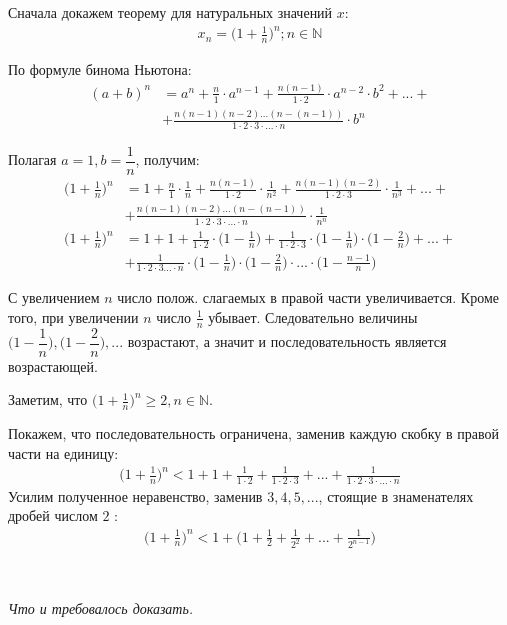 \documentclass[a4paper,12pt,oneside]{extbook}
\newcommand{\newpar}{$ $\par\nobreak\ignorespaces}
\theoremstyle{numbered}
\theoremstyle{unnumbered}
\theoremstyle{named}
\theoremstyle{unnumbered}
\theoremstyle{named}
\theoremstyle{named}
\theoremstyle{named}
\renewenvironment{proof}[1][]{\breakenv[Доказательство]{\if\relax\detokenize{#1}\relax\else\;\fi}{\textbf{#1}}}{\smallskip\newpar \hfill\textit{Что и требовалось доказать.}}
\begin{document}
\begin{proof}
    Сначала докажем теорему для натуральных значений \(x\):
    \begin{gather*}
        x_n = \Big(1 + \frac{1}{n}\Big)^n; n \in \mathbb{N}
    \end{gather*}

    По формуле бинома Ньютона:
    \begin{align*}
        (a + b)^n & = a^n + \frac{n}{1} \cdot a^{n - 1} + \frac{n(n - 1)}{1 \cdot 2} \cdot a^{n - 2} \cdot b^2 + ... + \\
                  & + \frac{n(n - 1)(n - 2)...(n - (n - 1))}{1 \cdot 2 \cdot 3 \cdot ... \cdot n} \cdot b^n
    \end{align*}

    Полагая \(a = 1, b = \dfrac{1}{n}\), получим:
    \begin{align*}
        \Big(1 + \frac{1}{n}\Big)^n & = 1 + \frac{n}{1} \cdot \frac{1}{n} + \frac{n(n - 1)}{1 \cdot 2} \cdot \frac{1}{n^2} +
        \frac{n(n - 1)(n - 2)}{1 \cdot 2 \cdot 3} \cdot \frac{1}{n^3} + ... +                                                                                                                             \\
                                    & +                            \frac{n(n - 1)(n - 2)...(n - (n - 1))}{1 \cdot 2 \cdot 3 \cdot ... \cdot n} \cdot \frac{1}{n^n}                                        \\
        \Big(1 + \frac{1}{n}\Big)^n & = 1 + 1 + \frac{1}{1 \cdot 2} \cdot \Big(1 - \frac{1}{n}\Big) + \frac{1}{1 \cdot 2 \cdot 3} \cdot \Big(1 - \frac{1}{n}\Big) \cdot \Big(1 - \frac{2}{n}\Big) + ... + \\
                                    & + \frac{1}{1 \cdot 2 \cdot 3 ... \cdot n} \cdot \Big(1 - \frac{1}{n}\Big) \cdot \Big(1 - \frac{2}{n}\Big) \cdot ... \cdot \Big(1 - \frac{n - 1}{n}\Big)
    \end{align*}

    С увеличением \(n\) число полож. слагаемых в правой части увеличивается. Кроме того, при увеличении \(n\) число  \(\frac{1}{n}\) убывает. Следовательно величины \(\Big(1 - \dfrac{1}{n}\Big), \Big(1 - \dfrac{2}{n}\Big), ...\) возрастают, а значит и последовательность является возрастающей.

    Заметим, что \(\Big(1 + \frac{1}{n}\Big)^n \geq 2, n \in \mathbb{N}\).

    Покажем, что последовательность ограничена, заменив каждую скобку в правой части на единицу:
    \begin{gather*}
        \Big(1 + \frac{1}{n}\Big)^n < 1 + 1 + \frac{1}{1 \cdot 2} + \frac{1}{1 \cdot 2 \cdot 3} + ... + \frac{1}{1 \cdot 2 \cdot 3 \cdot ... \cdot n}
    \end{gather*}
    Усилим полученное неравенство, заменив \(3, 4, 5, ...\), стоящие в знаменателях дробей числом  \(2\) :
    \begin{gather*}
        \Big(1 + \frac{1}{n}\Big)^n < 1 + \Big(1 + \frac{1}{2} + \frac{1}{2^2} + ... + \frac{1}{2^{n - 1}}\Big)
    \end{gather*}


\end{proof}
\end{document}
